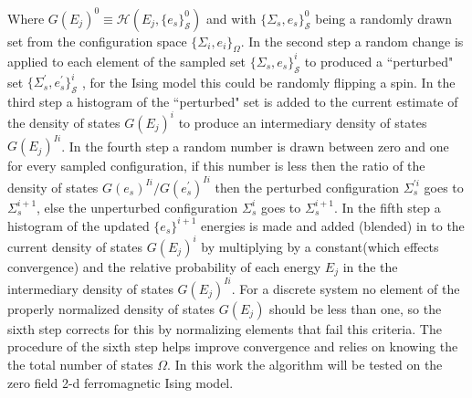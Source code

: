 \documentclass[twocolumn]{article}
\begin{document}
Where  $G(E_j)^0 \equiv \mathcal{H}(E_j,\{e_s\}_{\mathcal{S}}^0)$ and with $\{\Sigma_{s},e_s\}_{\mathcal{S}}^0$  being a randomly drawn set from the configuration space $\{ \Sigma_i, e_i \}_\Omega $. In the second step  a random change is applied to each element of the sampled set $\{\Sigma_{s},e_s\}_{\mathcal{S}}^i$ to produced a ``perturbed" set $ \{\Sigma_{s}^{'},e_s^{'}\}_{\mathcal{S}}^i$ , for the Ising model this could be randomly flipping a spin. In the third step a histogram of the ``perturbed" set is added to the current estimate of the density of states $G(E_j)^i$ to produce an intermediary density of states $G(E_j)^{Ii}$. In the fourth step a random number is drawn between zero and one for every sampled configuration, if this number is less then the ratio of the density of states $G(e_s)^{Ii}/G(e_s^{'})^{Ii}$ then the perturbed configuration $\Sigma_{s}^{'i}$ goes to $\Sigma_{s}^{i+1}$,  else the unperturbed configuration $\Sigma_{s}^{i}$ goes to $\Sigma_{s}^{i+1}$. In the fifth step a histogram of the updated $\{ e_s \}^{i+1}$ energies is made and added (blended) in to the current density of states $G(E_j)^i$   by multiplying  by a constant(which effects convergence) and the relative probability of each energy $E_j$ in the the intermediary density of states $G(E_j)^{Ii}$.  For a discrete system no element of the properly normalized density of states $G(E_j)$ should  be less than one, so the sixth step corrects for this by normalizing elements that fail this criteria. The procedure of the sixth step helps improve convergence and relies on knowing the the total number of states $\Omega$. In this work the algorithm will be tested on the zero field 2-d ferromagnetic Ising model. 
\end{document}
